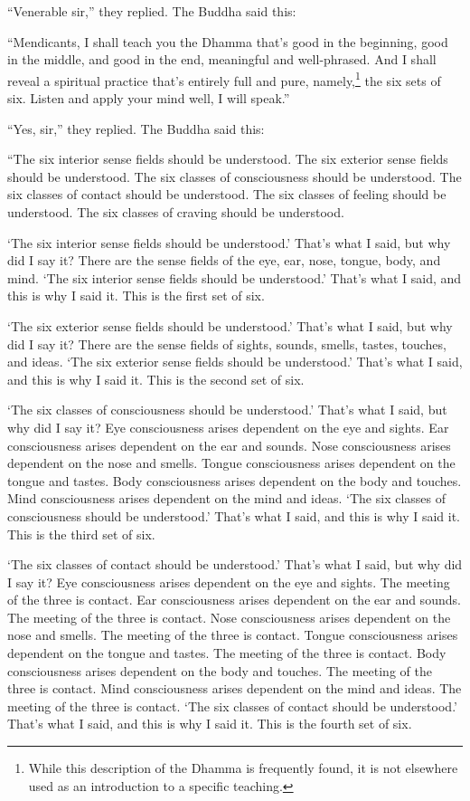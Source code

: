 \documentclass[12pt,openany]{book}%
\begin{document}
“Venerable sir,” they replied. The Buddha said this: 

“Mendicants, I shall teach you the Dhamma that’s good in the beginning, good in the middle, and good in the end, meaningful and well-phrased. And I shall reveal a spiritual practice that’s entirely full and pure, namely,\footnote{While this description of the Dhamma is frequently found, it is not elsewhere used as an introduction to a specific teaching. } the six sets of six. Listen and apply your mind well, I will speak.” 

“Yes, sir,” they replied. The Buddha said this: 

“The six interior sense fields should be understood. The six exterior sense fields should be understood. The six classes of consciousness should be understood. The six classes of contact should be understood. The six classes of feeling should be understood. The six classes of craving should be understood. 

‘The six interior sense fields should be understood.’ That’s what I said, but why did I say it? There are the sense fields of the eye, ear, nose, tongue, body, and mind. ‘The six interior sense fields should be understood.’ That’s what I said, and this is why I said it. This is the first set of six. 

‘The six exterior sense fields should be understood.’ That’s what I said, but why did I say it? There are the sense fields of sights, sounds, smells, tastes, touches, and ideas. ‘The six exterior sense fields should be understood.’ That’s what I said, and this is why I said it. This is the second set of six. 

‘The six classes of consciousness should be understood.’ That’s what I said, but why did I say it? Eye consciousness arises dependent on the eye and sights. Ear consciousness arises dependent on the ear and sounds. Nose consciousness arises dependent on the nose and smells. Tongue consciousness arises dependent on the tongue and tastes. Body consciousness arises dependent on the body and touches. Mind consciousness arises dependent on the mind and ideas. ‘The six classes of consciousness should be understood.’ That’s what I said, and this is why I said it. This is the third set of six. 

‘The six classes of contact should be understood.’ That’s what I said, but why did I say it? Eye consciousness arises dependent on the eye and sights. The meeting of the three is contact. Ear consciousness arises dependent on the ear and sounds. The meeting of the three is contact. Nose consciousness arises dependent on the nose and smells. The meeting of the three is contact. Tongue consciousness arises dependent on the tongue and tastes. The meeting of the three is contact. Body consciousness arises dependent on the body and touches. The meeting of the three is contact. Mind consciousness arises dependent on the mind and ideas. The meeting of the three is contact. ‘The six classes of contact should be understood.’ That’s what I said, and this is why I said it. This is the fourth set of six. 
\end{document}
